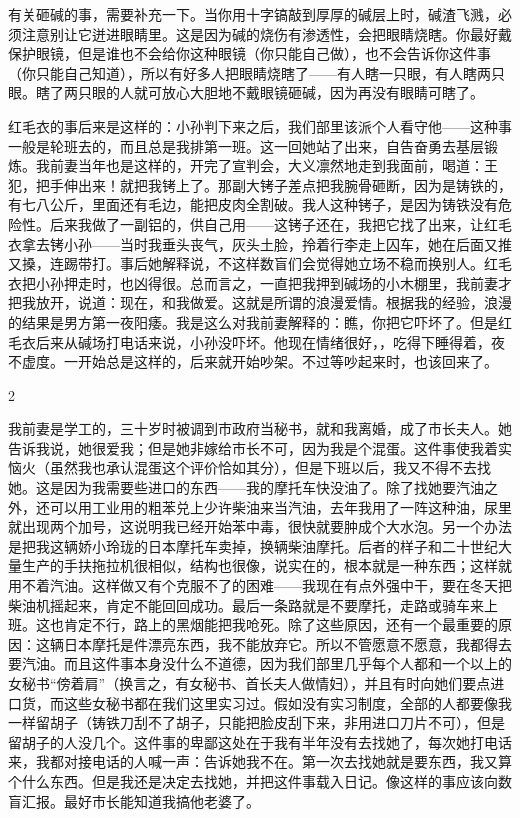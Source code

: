 有关砸碱的事，需要补充一下。当你用十字镐敲到厚厚的碱层上时，碱渣飞溅，必须注意别让它迸进眼睛里。这是因为碱的烧伤有渗透性，会把眼睛烧瞎。你最好戴保护眼镜，但是谁也不会给你这种眼镜（你只能自己做），也不会告诉你这件事（你只能自己知道），所以有好多人把眼睛烧瞎了——有人瞎一只眼，有人瞎两只眼。瞎了两只眼的人就可放心大胆地不戴眼镜砸碱，因为再没有眼睛可瞎了。 



红毛衣的事后来是这样的：小孙判下来之后，我们部里该派个人看守他——这种事一般是轮班去的，而且总是我排第一班。这一回她站了出来，自告奋勇去基层锻炼。我前妻当年也是这样的，开完了宣判会，大义凛然地走到我面前，喝道：王犯，把手伸出来！就把我铐上了。那副大铐子差点把我腕骨砸断，因为是铸铁的，有七八公斤，里面还有毛边，能把皮肉全割破。我人这种铐子，是因为铸铁没有危险性。后来我做了一副铝的，供自己用——这铐子还在，我把它找了出来，让红毛衣拿去铐小孙——当时我垂头丧气，灰头土脸，拎着行李走上囚车，她在后面又推又搡，连踢带打。事后她解释说，不这样数盲们会觉得她立场不稳而换别人。红毛衣把小孙押走时，也凶得很。总而言之，一直把我押到碱场的小木棚里，我前妻才把我放开，说道：现在，和我做爱。这就是所谓的浪漫爱情。根据我的经验，浪漫的结果是男方第一夜阳痿。我是这么对我前妻解释的：瞧，你把它吓坏了。但是红毛衣后来从碱场打电话来说，小孙没吓坏。他现在情绪很好，，吃得下睡得着，夜不虚度。一开始总是这样的，后来就开始吵架。不过等吵起来时，也该回来了。 



2 

我前妻是学工的，三十岁时被调到市政府当秘书，就和我离婚，成了市长夫人。她告诉我说，她很爱我；但是她非嫁给市长不可，因为我是个混蛋。这件事使我着实恼火（虽然我也承认混蛋这个评价恰如其分），但是下班以后，我又不得不去找她。这是因为我需要些进口的东西——我的摩托车快没油了。除了找她要汽油之外，还可以用工业用的粗苯兑上少许柴油来当汽油，去年我用了一阵这种油，尿里就出现两个加号，这说明我已经开始苯中毒，很快就要肿成个大水泡。另一个办法是把我这辆娇小玲珑的日本摩托车卖掉，换辆柴油摩托。后者的样子和二十世纪大量生产的手扶拖拉机很相似，结构也很像，说实在的，根本就是一种东西；这样就用不着汽油。这样做又有个克服不了的困难——我现在有点外强中干，要在冬天把柴油机摇起来，肯定不能回回成功。最后一条路就是不要摩托，走路或骑车来上班。这也肯定不行，路上的黑烟能把我呛死。除了这些原因，还有一个最重要的原因：这辆日本摩托是件漂亮东西，我不能放弃它。所以不管愿意不愿意，我都得去要汽油。而且这件事本身没什么不道德，因为我们部里几乎每个人都和一个以上的女秘书“傍着肩”（换言之，有女秘书、首长夫人做情妇），并且有时向她们要点进口货，而这些女秘书都在我们这里实习过。假如没有实习制度，全部的人都要像我一样留胡子（铸铁刀刮不了胡子，只能把脸皮刮下来，非用进口刀片不可），但是留胡子的人没几个。这件事的卑鄙这处在于我有半年没有去找她了，每次她打电话来，我都对接电话的人喊一声：告诉她我不在。第一次去找她就是要东西，我又算个什么东西。但是我还是决定去找她，并把这件事载入日记。像这样的事应该向数盲汇报。最好市长能知道我搞他老婆了。 

